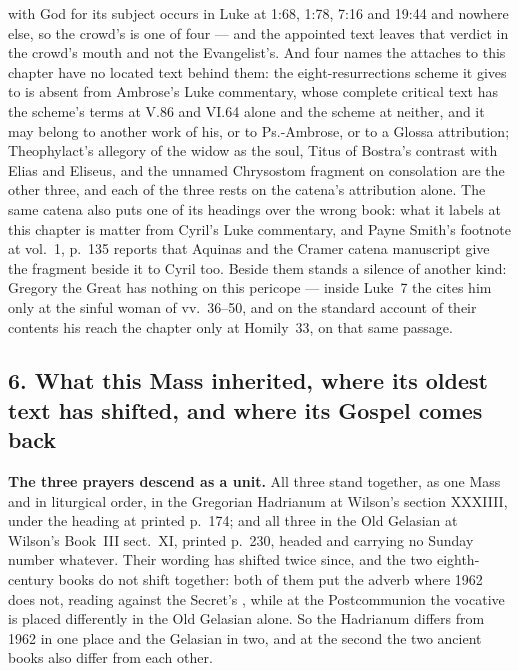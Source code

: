  with
God for its subject occurs in Luke at 1:68, 1:78, 7:16 and 19:44 and nowhere
else, so the crowd's  is one of four --- and
the appointed text leaves that verdict in the crowd's mouth and not the
Evangelist's. And four names the  attaches to this chapter
have no located text behind them: the eight-resurrections scheme it gives to
 is absent from Ambrose's Luke commentary, whose complete
critical text has the scheme's terms at V.86 and VI.64 alone and the scheme at
neither, and it may belong to another work of his, or to Ps.-Ambrose, or to a
Glossa attribution; Theophylact's allegory of the widow as the soul, Titus of
Bostra's contrast with Elias and Eliseus, and the unnamed Chrysostom fragment
on consolation are the other three, and each of the three rests on the catena's
attribution alone. The same catena also puts one of its headings over the wrong book:
what it labels  at this chapter is matter from
Cyril's Luke commentary, and Payne Smith's footnote at vol.~1, p.~135 reports
that Aquinas and the Cramer catena manuscript give the fragment beside it to
Cyril too. Beside them stands a silence of another kind: Gregory the
Great has nothing on this pericope --- inside Luke~7 the  cites
him only at the sinful woman of vv.~36--50, and on the standard account of
their contents his  reach the chapter only at
Homily~33, on that same passage.

\subsection*{6. What this Mass inherited, where its oldest text has shifted, and where its Gospel comes back}

\textbf{The three prayers descend as a unit.} All three stand together, as one Mass and in liturgical order, in
the Gregorian Hadrianum at Wilson's section XXXIIII, under the heading
 at printed p.~174; and all three in
the Old Gelasian at Wilson's Book~III sect.~XI, printed p.~230, headed
 and carrying no Sunday number whatever. Their wording
has shifted twice since, and the two eighth-century books do not shift
together: both of them put the adverb where 1962 does not, reading
 against the Secret's , while at the Postcommunion the vocative is placed differently in
the Old Gelasian alone. So the Hadrianum differs from 1962 in one place and
the Gelasian in two, and at the second the two ancient books also differ from
each other.

